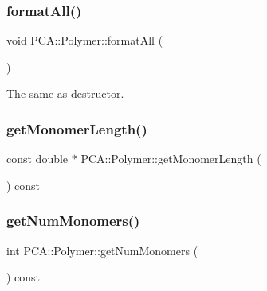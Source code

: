 \hypertarget{class_p_c_a_1_1_polymer_a3fcca4084a54ac8bc1941b36462bc560}{}\label{class_p_c_a_1_1_polymer_a3fcca4084a54ac8bc1941b36462bc560} 
\subsubsection{\texorpdfstring{format\+All()}{formatAll()}}
{\footnotesize\ttfamily void P\+C\+A\+::\+Polymer\+::format\+All (\begin{DoxyParamCaption}{ }\end{DoxyParamCaption})\hspace{0.3cm}{\ttfamily [protected]}}



The same as destructor. 

\hypertarget{class_p_c_a_1_1_polymer_af05e598bcd1e9987aca46d0661ac6dca}{}\label{class_p_c_a_1_1_polymer_af05e598bcd1e9987aca46d0661ac6dca} 
\subsubsection{\texorpdfstring{get\+Monomer\+Length()}{getMonomerLength()}}
{\footnotesize\ttfamily const double $\ast$ P\+C\+A\+::\+Polymer\+::get\+Monomer\+Length (\begin{DoxyParamCaption}{ }\end{DoxyParamCaption}) const}

\hypertarget{class_p_c_a_1_1_polymer_a5c87b083f77c06ffd14278f87dad47ea}{}\label{class_p_c_a_1_1_polymer_a5c87b083f77c06ffd14278f87dad47ea} 
\subsubsection{\texorpdfstring{get\+Num\+Monomers()}{getNumMonomers()}}
{\footnotesize\ttfamily int P\+C\+A\+::\+Polymer\+::get\+Num\+Monomers (\begin{DoxyParamCaption}{ }\end{DoxyParamCaption}) const\hspace{0.3cm}{\ttfamily [inline]}}

